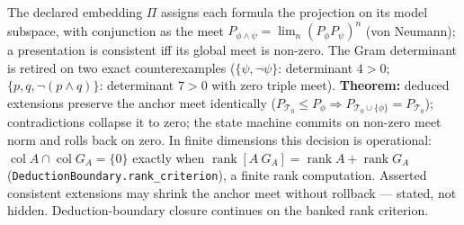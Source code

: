 \documentclass[
]{article}
\begin{document}
The declared embedding \(\Pi\) assigns each formula the projection on
its model subspace, with conjunction as the meet
\(P_{\phi\wedge\psi}=\lim_n(P_\phi P_\psi)^n\) (von Neumann); a
presentation is consistent iff its global meet is non-zero. The Gram
determinant is retired on two exact counterexamples
(\(\{\psi,\neg\psi\}\): determinant \(4>0\);
\(\{p,q,\neg(p\wedge q)\}\): determinant \(7>0\) with zero triple meet).
\textbf{Theorem:} deduced extensions preserve the anchor meet
identically
(\(P_{\mathcal T_0}\le P_\phi\Rightarrow P_{\mathcal T_0\cup\{\phi\}}=P_{\mathcal T_0}\));
contradictions collapse it to zero; the state machine commits on
non-zero meet norm and rolls back on zero. In finite dimensions this
decision is operational:
\(\operatorname{col}A\cap\operatorname{col}G_A=\{0\}\) exactly when
\(\operatorname{rank}[A\ G_A]=\operatorname{rank}A+\operatorname{rank}G_A\)
(\texttt{D\allowbreak{}e\allowbreak{}d\allowbreak{}u\allowbreak{}c\allowbreak{}t\allowbreak{}i\allowbreak{}o\allowbreak{}n\allowbreak{}B\allowbreak{}o\allowbreak{}u\allowbreak{}n\allowbreak{}d\allowbreak{}a\allowbreak{}r\allowbreak{}y\allowbreak{}.\allowbreak{}r\allowbreak{}a\allowbreak{}n\allowbreak{}k\allowbreak{}\_\allowbreak{}c\allowbreak{}r\allowbreak{}i\allowbreak{}t\allowbreak{}e\allowbreak{}r\allowbreak{}i\allowbreak{}o\allowbreak{}n}),
a finite rank computation. Asserted consistent extensions may shrink the
anchor meet without rollback --- stated, not hidden. Deduction-boundary
closure continues on the banked rank criterion.
\end{document}
